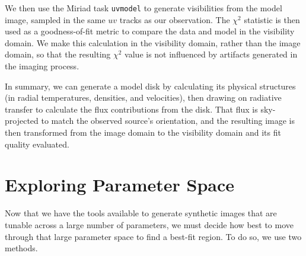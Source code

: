 
We then use the Miriad task \texttt{uvmodel} to generate visibilities from the model image, sampled in the same $uv$ tracks as our observation. The $\chi^2$ statistic is then used as a goodness-of-fit metric to compare the data and model in the visibility domain. We make this calculation in the visibility domain, rather than the image domain, so that the resulting $\chi^2$ value is not influenced by artifacts generated in the imaging process.


In summary, we can generate a model disk by calculating its physical structures (in radial temperatures, densities, and velocities), then drawing on radiative transfer to calculate the flux contributions from the disk. That flux is sky-projected to match the observed source's orientation, and the resulting image is then transformed from the image domain to the visibility domain and its fit quality evaluated.



\section{Exploring Parameter Space}
\label{section:param_space}

Now that we have the tools available to generate synthetic images that are tunable across a large number of parameters, we must decide how best to move through that large parameter space to find a best-fit region. To do so, we use two methods.

